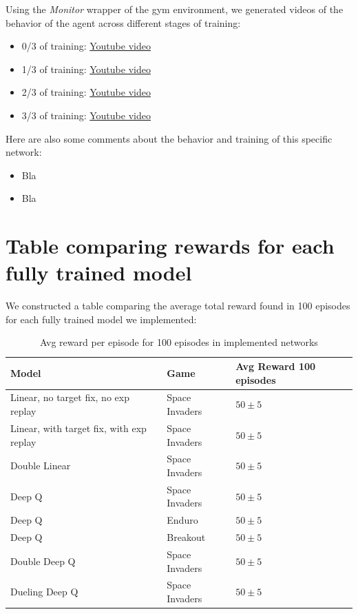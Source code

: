 \documentclass{article}
\begin{document}

Using the \textit{Monitor} wrapper of the gym environment, we generated videos of the behavior of the agent across different stages of training:

\begin{itemize}
  \item 0/3 of training: \href{http://www.sharelatex.com}{Youtube video}
  \item 1/3 of training: \href{http://www.sharelatex.com}{Youtube video}
  \item 2/3 of training: \href{http://www.sharelatex.com}{Youtube video}
  \item 3/3 of training: \href{http://www.sharelatex.com}{Youtube video}
\end{itemize}

Here are also some comments about the behavior and training of this specific network:

\begin{itemize}
  \item Bla
  \item Bla
\end{itemize}

\section{Table comparing rewards for each fully trained model} %
\label{sec:table_comparing_rewards_for_each_fully_trained_model}
We constructed a table comparing the average total reward found in 100 episodes for each fully trained model we implemented:

\begin{table}[h]
  \caption{Avg reward per episode for 100 episodes in implemented networks}
  \label{sample-table}
  \centering
  \begin{tabular}{lll}
    \toprule

    Model     & Game     & Avg Reward 100 episodes \\
    \midrule
    Linear, no target fix, no exp replay & Space Invaders  & $50\pm5$     \\
    Linear, with target fix, with exp replay & Space Invaders  & $50\pm5$     \\
    Double Linear & Space Invaders  & $50\pm5$     \\
    Deep Q & Space Invaders  & $50\pm5$     \\
    Deep Q & Enduro  & $50\pm5$     \\
    Deep Q & Breakout  & $50\pm5$     \\
    Double Deep Q & Space Invaders  & $50\pm5$     \\
    Dueling Deep Q & Space Invaders  & $50\pm5$     \\
    \bottomrule
  \end{tabular}
\end{table}
\end{document}
